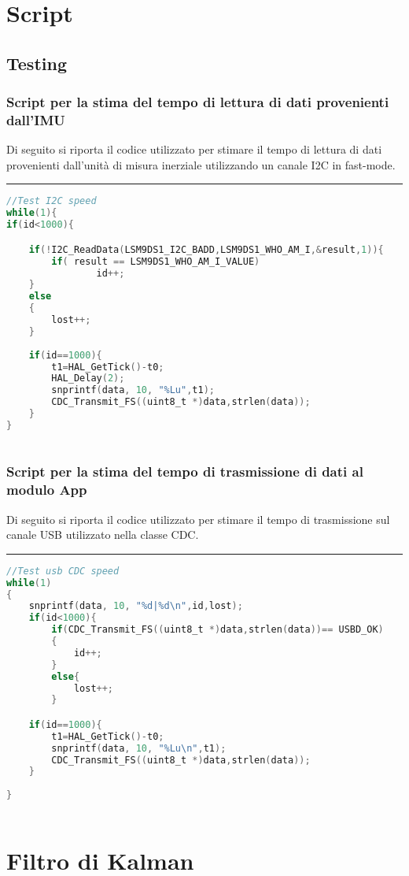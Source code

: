 \appendix


\chapter{Script}

\section{Testing}
\subsection{Script per la stima del tempo di lettura di dati provenienti dall'IMU }
\label{app:stimai2c}
Di seguito si riporta il codice utilizzato per stimare il tempo di lettura di dati provenienti dall'unità di misura inerziale utilizzando un canale I2C in fast-mode.\\
\noindent\rule{14.1cm}{0.4pt}
\begin{lstlisting}[language=C]
//Test I2C speed
while(1){
if(id<1000){

	if(!I2C_ReadData(LSM9DS1_I2C_BADD,LSM9DS1_WHO_AM_I,&result,1)){
		if( result == LSM9DS1_WHO_AM_I_VALUE)
				id++;
	}
	else
	{
		lost++;
	}
	
 	if(id==1000){
		t1=HAL_GetTick()-t0;
		HAL_Delay(2);
		snprintf(data, 10, "%Lu",t1);
		CDC_Transmit_FS((uint8_t *)data,strlen(data));
	}
}



\end{lstlisting}


\subsection{Script per la stima del tempo di trasmissione di dati al modulo App}
\label{app:stimausb}
Di seguito si riporta il codice utilizzato per stimare il tempo di trasmissione sul canale USB utilizzato nella classe CDC.\\
\noindent\rule{14.1cm}{0.4pt}

\begin{lstlisting}[language=C]
 //Test usb CDC speed
while(1)
{
	snprintf(data, 10, "%d|%d\n",id,lost);
	if(id<1000){
		if(CDC_Transmit_FS((uint8_t *)data,strlen(data))== USBD_OK)
		{
			id++;
		}
		else{
			lost++;
		}

	if(id==1000){
		t1=HAL_GetTick()-t0;
		snprintf(data, 10, "%Lu\n",t1);
		CDC_Transmit_FS((uint8_t *)data,strlen(data));
	}
	
}



\end{lstlisting}


\chapter{Filtro di Kalman}
\label{appendixKalman}
